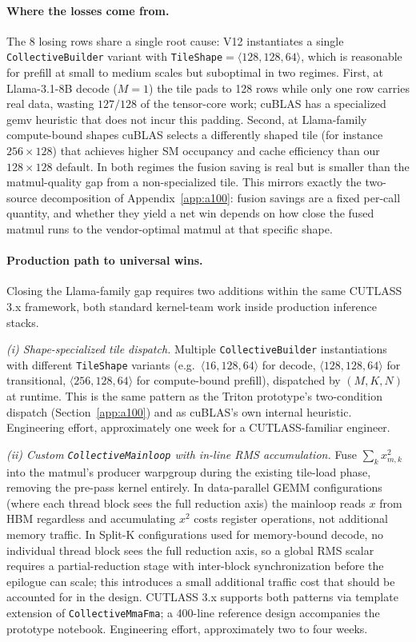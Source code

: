 \documentclass{article}
\begin{document}
\paragraph{Where the losses come from.} The 8 losing rows share a single root cause: V12 instantiates a single \texttt{CollectiveBuilder} variant with \texttt{TileShape}$=\langle 128, 128, 64 \rangle$, which is reasonable for prefill at small to medium scales but suboptimal in two regimes. First, at Llama-3.1-8B decode ($M{=}1$) the tile pads to 128 rows while only one row carries real data, wasting $127/128$ of the tensor-core work; cuBLAS has a specialized gemv heuristic that does not incur this padding. Second, at Llama-family compute-bound shapes cuBLAS selects a differently shaped tile (for instance $256{\times}128$) that achieves higher SM occupancy and cache efficiency than our $128{\times}128$ default. In both regimes the fusion saving is real but is smaller than the matmul-quality gap from a non-specialized tile. This mirrors exactly the two-source decomposition of Appendix~\ref{app:a100}: fusion savings are a fixed per-call quantity, and whether they yield a net win depends on how close the fused matmul runs to the vendor-optimal matmul at that specific shape.

\paragraph{Production path to universal wins.} Closing the Llama-family gap requires two additions within the same CUTLASS 3.x framework, both standard kernel-team work inside production inference stacks.

\textit{(i) Shape-specialized tile dispatch.} Multiple \texttt{CollectiveBuilder} instantiations with different \texttt{TileShape} variants (e.g.\ $\langle 16, 128, 64 \rangle$ for decode, $\langle 128, 128, 64 \rangle$ for transitional, $\langle 256, 128, 64 \rangle$ for compute-bound prefill), dispatched by $(M, K, N)$ at runtime. This is the same pattern as the Triton prototype's two-condition dispatch (Section~\ref{app:a100}) and as cuBLAS's own internal heuristic. Engineering effort, approximately one week for a CUTLASS-familiar engineer.

\textit{(ii) Custom \texttt{CollectiveMainloop} with in-line RMS accumulation.} Fuse $\sum_k x^2_{m,k}$ into the matmul's producer warpgroup during the existing tile-load phase, removing the pre-pass kernel entirely. In data-parallel GEMM configurations (where each thread block sees the full reduction axis) the mainloop reads $x$ from HBM regardless and accumulating $x^2$ costs register operations, not additional memory traffic. In Split-K configurations used for memory-bound decode, no individual thread block sees the full reduction axis, so a global RMS scalar requires a partial-reduction stage with inter-block synchronization before the epilogue can scale; this introduces a small additional traffic cost that should be accounted for in the design. CUTLASS 3.x supports both patterns via template extension of \texttt{CollectiveMmaFma}; a 400-line reference design accompanies the prototype notebook. Engineering effort, approximately two to four weeks.
\end{document}
